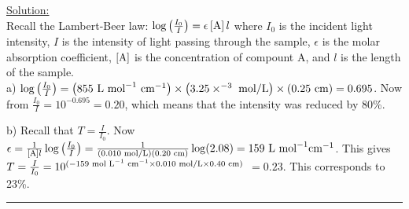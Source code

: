 \noindent
\underline{Solution:}\\

\noindent
Recall the Lambert-Beer law: $\log\left(\frac{I_0}{I}\right) = \epsilon\left[\textnormal{A}\right]l$ where $I_0$ is the incident light intensity, $I$ is the intensity of light passing through the sample, $\epsilon$ is the molar absorption coefficient, $\left[\textnormal{A}\right]$ is the concentration of compount A, and $l$ is the length of the sample.\\

\noindent
a) $\log\left(\frac{I_0}{I}\right) = \left(855\textnormal{ L mol}^{-1}\textnormal{ cm}^{-1}\right)\times\left(3.25\times^{-3}\textnormal{ mol/L}\right)\times\left(0.25\textnormal{ cm}\right) = 0.695$. Now from $\frac{I_0}{I} = 10^{-0.695} = 0.20$, which means that the intensity was reduced by 80\%.

\noindent
b) Recall that $T = \frac{I}{I_0}$. Now $\epsilon = \frac{1}{\left[\textnormal{A}\right]l}\log\left(\frac{I_0}{I}\right) = \frac{1}{\left(0.010\textnormal{ mol/L}\right)\left(0.20\textnormal{ cm}\right)}\log(2.08) = 159\textnormal{ L mol}^{-1}\textnormal{cm}^{-1}$. This gives $T = \frac{I}{I_0} = 10^{(-159\textnormal{ mol L}^{-1}\textnormal{ cm}^{-1}\times 0.010\textnormal{ mol/L}\times 0.40\textnormal{ cm})}$ $= 0.23$. This corresponds to 23\%.

\hrule\vspace{0.5cm}



